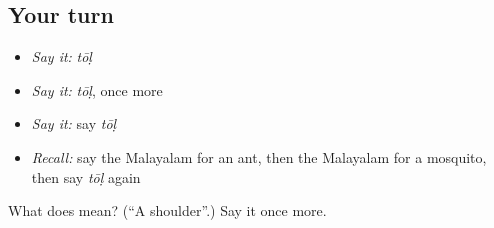 \subsection*{Your turn}
\begin{itemize}
\raggedright
  \item \emph{Say it:} \emph{tōḷ}
  \item \emph{Say it:} \emph{tōḷ}, once more
  \item \emph{Say it:} say \emph{tōḷ}
  \item \emph{Recall:} say the Malayalam for an ant, then the Malayalam for a mosquito, then say \emph{tōḷ} again
\end{itemize}

\begin{tcolorbox}[breakable,colback=teal!4,colframe=teal!35!black,title={Before you move on}]
What does  mean? (\textquotedblleft{}A shoulder\textquotedblright{}.) Say it once more.
\end{tcolorbox}
